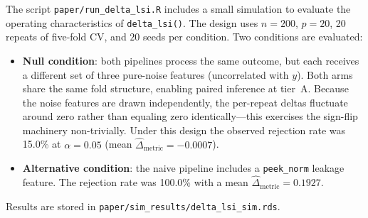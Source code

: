 \documentclass[article]{jss}
\begin{document}
The script \texttt{paper/run\_delta\_lsi.R} includes a small simulation to
evaluate the operating characteristics of \texttt{delta\_lsi()}. The design
uses $n = 200$, $p = 20$, 20 repeats of five-fold CV, and $20$ seeds per
condition. Two conditions are evaluated:

\begin{itemize}
\item \textbf{Null condition}: both pipelines process the same outcome, but
each receives a different set of three pure-noise features (uncorrelated with
$y$). Both arms share the same fold structure, enabling paired inference at
tier~A. Because the noise features are drawn independently, the per-repeat
deltas fluctuate around zero rather than equaling zero identically---this
exercises the sign-flip machinery non-trivially. Under this design the
observed rejection rate was 15.0\% at $\alpha = 0.05$
(mean $\widehat{\Delta}_{\mathrm{metric}} = -0.0007$).

\item \textbf{Alternative condition}: the naive pipeline includes a
\texttt{peek\_norm} leakage feature. The rejection rate was
100.0\% with a mean
$\widehat{\Delta}_{\mathrm{metric}} = 0.1927$.
\end{itemize}

\noindent
Results are stored in \texttt{paper/sim\_results/delta\_lsi\_sim.rds}.

\end{document}
